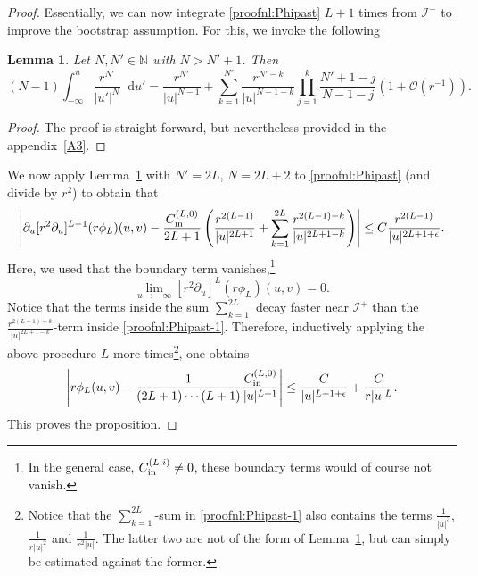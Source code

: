 \documentclass[11pt,english]{article}
\numberwithin{equation}{section}
\newtheorem{lemma}{Lemma}[section]
\theoremstyle{remark}
\theoremstyle{plain}
\theoremstyle{remark}
\newcommand{\dd}{\mathop{}\!\mathrm{d}}
\newcommand{\pu}{\partial_u}
\renewcommand{\(}{\left(}
\renewcommand{\)}{\right)}
\begin{document}
\begin{proof}
Essentially, we can now integrate \eqref{proofnl:Phipast}  $L+1$ times from $\mathcal I^-$ to improve the bootstrap assumption. For this, we invoke the following
\begin{lemma}\label{lemma9.1}
Let $N, N'\in \mathbb{N}$ with $N>N'+1$. Then
\begin{equation}\label{eq:lemma91}
(N-1)\int_{-\infty}^u\frac{r^{N'}}{|u'|^{N}}\dd u'=\frac{r^{N'}}{|u|^{N-1}}
+\sum_{k=1}^{N'}\frac{r^{N'-k}}{|u|^{N-1-k}}\prod_{j=1}^k\frac{N'+1-j}{N-1-j}\left(1+\mathcal{O}(r^{-1})\right).
\end{equation}
\end{lemma}
\begin{proof}
The proof is straight-forward, but nevertheless provided in the appendix~\ref{A3}.
\end{proof}
We now apply Lemma~\ref{lemma9.1} with $N'=2L$, $N=2L+2$ to \eqref{proofnl:Phipast} (and divide by $r^2$) to obtain that
\begin{equation}\label{proofnl:Phipast-1}
\left|\pu[r^2\pu]^{L-1}(r\phi_L)(u,v)-\frac{\cl{0}}{2L+1}\left(\frac{r^{2(L-1)}}{|u|^{2L+1}}+
\sum_{k=1}^{2L}\frac{r^{2(L-1)-k}}{|u|^{2L+1-k}}\right)\right|\leq C\frac{r^{2(L-1)}}{|u|^{2L+1+\epsilon}}.
\end{equation}
Here, we used that the boundary term vanishes,\footnote{In the general case, $C_{\mathrm{in}}^{(L,i)}\neq0$, these boundary terms would of course not vanish.} $$\lim_{u\to-\infty}[r^2\pu]^L(r\phi_L)(u,v)=0.$$
Notice that the terms inside the sum $\sum_{k=1}^{2L}$ decay faster near $\mathcal{I}^+$ than the $\frac{r^{2(L-1)-k}}{|u|^{2L+1-k}}$-term inside \eqref{proofnl:Phipast-1}. 
Therefore, inductively applying the above procedure $L$ more times\footnote{Notice that the $\sum_{k=1}^{2L}$-sum in \eqref{proofnl:Phipast-1} also contains the terms $\frac{1}{|u|^3}$, $\frac{1}{r|u|^2}$ and $\frac{1}{r^2|u|}$. The latter two are not of the form of Lemma~\ref{lemma9.1}, but can simply  be estimated against the former.}, one obtains
\begin{equation}
\left|r\phi_L(u,v)-\frac{1}{(2L+1)\cdots (L+1)}\frac{C_{\mathrm{in}}^{(L,0)}}{|u|^{L+1}}\right|\leq \frac{C}{|u|^{L+1+\epsilon}}+\frac{C}{r|u|^L}.
\end{equation}
This proves the proposition.
\end{proof}
\end{document}
